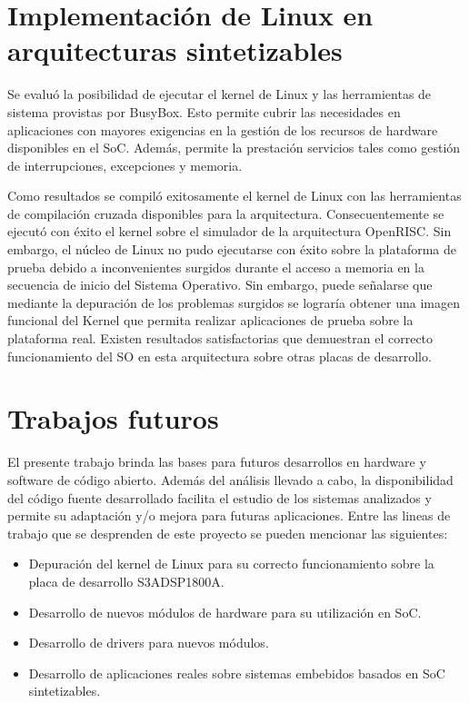 \section{Implementación de Linux en arquitecturas sintetizables}

Se evaluó la posibilidad de ejecutar el kernel de Linux y las herramientas de sistema provistas por BusyBox. Esto permite cubrir las necesidades en aplicaciones con mayores exigencias en la gestión de los recursos de hardware disponibles en el SoC. Además, permite la prestación servicios tales como gestión de interrupciones, excepciones y memoria.

Como resultados se compiló exitosamente el kernel de Linux con las herramientas de compilación cruzada disponibles para la arquitectura. Consecuentemente se ejecutó con éxito el kernel sobre el simulador de la arquitectura OpenRISC. Sin embargo, el núcleo de Linux no pudo ejecutarse con éxito sobre la plataforma de prueba debido a inconvenientes surgidos durante el acceso a memoria en la secuencia de inicio del Sistema Operativo. Sin embargo, puede señalarse que mediante la depuración de los problemas surgidos se lograría obtener una imagen funcional del Kernel que permita realizar aplicaciones de prueba sobre la plataforma real. Existen resultados satisfactorias que demuestran el correcto funcionamiento del SO en esta arquitectura sobre otras placas de desarrollo.

\section{Trabajos futuros}

El presente trabajo brinda las bases para futuros desarrollos en hardware y software de código abierto. Además del análisis llevado a cabo, la disponibilidad del código fuente desarrollado facilita el estudio de los sistemas analizados y permite su adaptación y/o mejora para futuras aplicaciones. Entre las lineas de trabajo que se desprenden de este proyecto se pueden mencionar las siguientes:

\begin {itemize}
\item Depuración del kernel de Linux para su correcto funcionamiento sobre la placa de desarrollo S3ADSP1800A.
\item Desarrollo de nuevos módulos de hardware para su utilización en SoC.
\item Desarrollo de drivers para nuevos módulos.
\item Desarrollo de aplicaciones reales sobre sistemas embebidos basados en SoC sintetizables.
\end{itemize}

